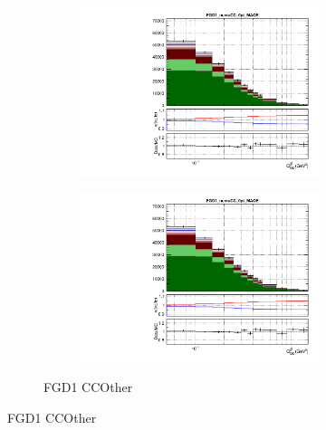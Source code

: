 \begin{figure}[h]
	\begin{subfigure}[t]{\textwidth}
	\begin{subfigure}[t]{0.49\textwidth}
		\includegraphics[width=\textwidth, trim={0mm 0mm 0mm 6mm}, clip,page=97]{figures/mach3/data/postfit/2017b_NewData_NewDet_UpdXsecStep_2Xsec_4Det_5Flux_0_PostFit_5_4_rootstack}
	\end{subfigure}
	\begin{subfigure}[t]{0.49\textwidth}
		\includegraphics[width=\textwidth, trim={0mm 0mm 0mm 6mm}, clip,page=98]{figures/mach3/data/postfit/2017b_NewData_NewDet_UpdXsecStep_2Xsec_4Det_5Flux_0_PostFit_5_4_rootstack}
	\end{subfigure}
\caption{FGD1 CCOther}
\end{subfigure}


\end{figure}
